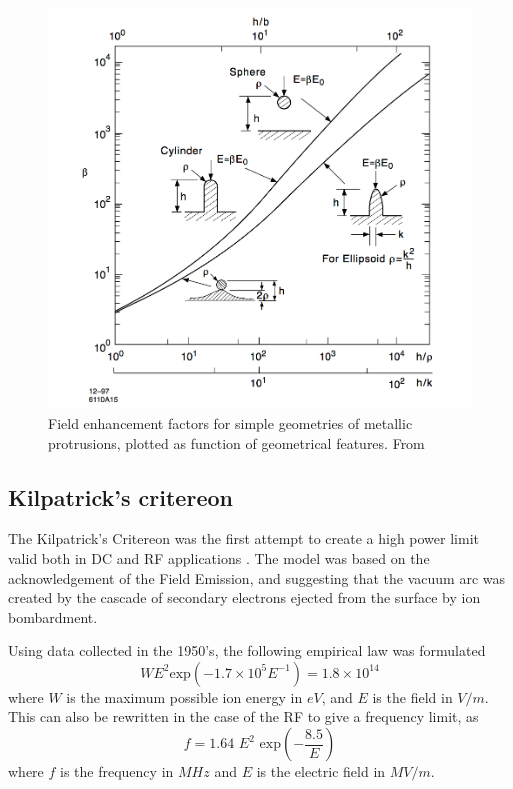 \begin{figure}[h]
\centering

\includegraphics[scale=0.3]{pictures/beta_tip_val}
\caption{Field enhancement factors for simple geometries of metallic protrusions, plotted as function of geometrical features. From \cite{Rohrbach:190223}}
\label{tip_factors}

\end{figure}






\subsection[Kilpatrick's critereon]{Kilpatrick's critereon}

The Kilpatrick's Critereon was the first attempt to create a high power limit valid both in DC and RF applications \cite{KilpLimit}. The model was based on the acknowledgement of the Field Emission, and suggesting that the vacuum arc was created by the cascade of secondary electrons ejected from the surface by ion bombardment.

Using data collected in the 1950's, the following empirical law was formulated
\begin{equation}
W E^2 \text{exp} \left (  -1.7\times 10^5 E^{-1}  \right ) = 1.8 \times 10^{14}
\label{KilpLaw}
\end{equation}
where $W$ is the maximum possible ion energy in $eV$, and $E$ is the field in $V/m$. This can also be rewritten in the case of the RF to give a frequency limit, as
\begin{equation}
f = 1.64 \,\, E^2 \,\, \text{exp} \left (  -\frac{8.5}{E} \right )
\end{equation}
where $f$ is the frequency in $MHz$ and $E$ is the electric field in $MV/m$.

